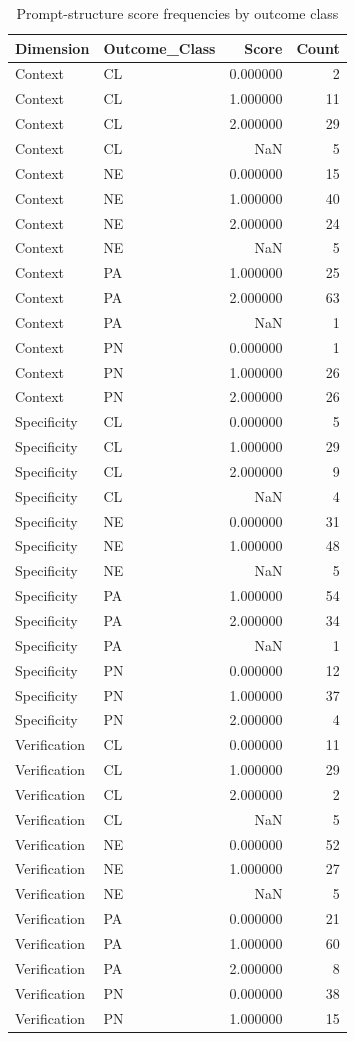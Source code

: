 \begin{table}
\caption{Prompt-structure score frequencies by outcome class}
\label{tab:code-frequencies}
\begin{tabular}{llrr}
\toprule
Dimension & Outcome\_Class & Score & Count \\
\midrule
Context & CL & 0.000000 & 2 \\
Context & CL & 1.000000 & 11 \\
Context & CL & 2.000000 & 29 \\
Context & CL & NaN & 5 \\
Context & NE & 0.000000 & 15 \\
Context & NE & 1.000000 & 40 \\
Context & NE & 2.000000 & 24 \\
Context & NE & NaN & 5 \\
Context & PA & 1.000000 & 25 \\
Context & PA & 2.000000 & 63 \\
Context & PA & NaN & 1 \\
Context & PN & 0.000000 & 1 \\
Context & PN & 1.000000 & 26 \\
Context & PN & 2.000000 & 26 \\
Specificity & CL & 0.000000 & 5 \\
Specificity & CL & 1.000000 & 29 \\
Specificity & CL & 2.000000 & 9 \\
Specificity & CL & NaN & 4 \\
Specificity & NE & 0.000000 & 31 \\
Specificity & NE & 1.000000 & 48 \\
Specificity & NE & NaN & 5 \\
Specificity & PA & 1.000000 & 54 \\
Specificity & PA & 2.000000 & 34 \\
Specificity & PA & NaN & 1 \\
Specificity & PN & 0.000000 & 12 \\
Specificity & PN & 1.000000 & 37 \\
Specificity & PN & 2.000000 & 4 \\
Verification & CL & 0.000000 & 11 \\
Verification & CL & 1.000000 & 29 \\
Verification & CL & 2.000000 & 2 \\
Verification & CL & NaN & 5 \\
Verification & NE & 0.000000 & 52 \\
Verification & NE & 1.000000 & 27 \\
Verification & NE & NaN & 5 \\
Verification & PA & 0.000000 & 21 \\
Verification & PA & 1.000000 & 60 \\
Verification & PA & 2.000000 & 8 \\
Verification & PN & 0.000000 & 38 \\
Verification & PN & 1.000000 & 15 \\
\bottomrule
\end{tabular}
\end{table}
